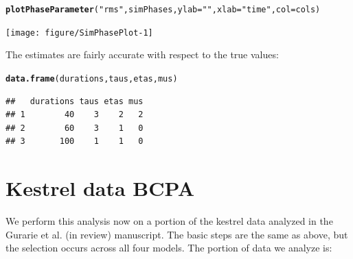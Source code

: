 \documentclass[10pt]{article}\usepackage[]{graphicx}\usepackage[]{color}
\makeatletter
\newcommand{\hlstr}[1]{\textcolor[rgb]{0.192,0.494,0.8}{#1}}%
\newcommand{\hlstd}[1]{\textcolor[rgb]{0.345,0.345,0.345}{#1}}%
\newcommand{\hlkwc}[1]{\textcolor[rgb]{0.333,0.667,0.333}{#1}}%
\newcommand{\hlkwd}[1]{\textcolor[rgb]{0.737,0.353,0.396}{\textbf{#1}}}%
\newenvironment{kframe}{%
 \def\at@end@of@kframe{}%
 \ifinner\ifhmode%
  \def\at@end@of@kframe{\end{minipage}}%
  \begin{minipage}{\columnwidth}%
 \fi\fi%
 \def\FrameCommand##1{\hskip\@totalleftmargin \hskip-\fboxsep
 \colorbox{shadecolor}{##1}\hskip-\fboxsep
     \hskip-\linewidth \hskip-\@totalleftmargin \hskip\columnwidth}%
 \MakeFramed {\advance\hsize-\width
   \@totalleftmargin\z@ \linewidth\hsize
   \@setminipage}}%
 {\par\unskip\endMakeFramed%
 \at@end@of@kframe}
\newenvironment{knitrout}{}{} %
\makeatother
\begin{document}
\begin{knitrout}
\begin{kframe}
{\ttfamily\noindent\bfseries{}}\begin{alltt}
  \hlkwd{plotPhaseParameter}\hlstd{(}\hlstr{"rms"}\hlstd{, simPhases,}  \hlkwc{ylab}\hlstd{=} \hlstr{""}\hlstd{,} \hlkwc{xlab}\hlstd{=}\hlstr{"time"}\hlstd{,} \hlkwc{col}\hlstd{=cols)}
\end{alltt}


{\ttfamily\noindent\bfseries{}}\end{kframe}
\texttt{[image: figure/SimPhasePlot-1]} 

\end{knitrout}

\noindent The estimates are fairly accurate with respect to the true values:
\begin{knitrout}
\color{fgcolor}\begin{kframe}
\begin{alltt}
\hlkwd{data.frame}\hlstd{(durations, taus, etas, mus)}
\end{alltt}
\begin{verbatim}
##   durations taus etas mus
## 1        40    3    2   2
## 2        60    3    1   0
## 3       100    1    1   0
\end{verbatim}
\end{kframe}
\end{knitrout}


\section{Kestrel data BCPA}

We perform this analysis now on a portion of the kestrel data analyzed in the Gurarie et al. (in review) manuscript.  The basic steps are the same as above, but the selection occurs across all four models. The portion of data we analyze is:
\end{document}
